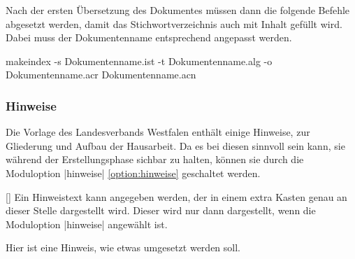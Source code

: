 \documentclass[
    a4paper,
    12pt,
    parskip=half,
]{scrartcl}
\begin{document}
\begin{sourcecode}
    \printglossary[type=\acronymtype,title=Abkürzungsverzeichnis,style=long]
\end{sourcecode}

Nach der ersten Übersetzung des Dokumentes müssen dann die folgende Befehle abgesetzt werden, damit das Stichwortverzeichnis auch mit Inhalt gefüllt wird. Dabei muss der Dokumentenname entsprechend angepasst werden.

\begin{sourcecode}
    makeindex -s Dokumentenname.ist -t Dokumentenname.alg -o Dokumentenname.acr Dokumentenname.acn
\end{sourcecode}

\subsubsection{Hinweise}\label{sec:HausarbeitHinweise}
Die Vorlage des Landesverbands Westfalen enthält einige Hinweise, zur Gliederung und Aufbau der Hausarbeit. Da es bei diesen sinnvoll sein kann, sie während der Erstellungsphase sichbar zu halten, können sie durch die Moduloption \verbcode|hinweise| \ref{option:hinweise} geschaltet werden.

\begin{commands}
    []
        Ein Hinweistext kann angegeben werden, der in einem extra Kasten genau an dieser Stelle dargestellt wird. Dieser wird nur dann dargestellt, wenn die Moduloption \verbcode|hinweise| angewählt ist.
\begin{sourcecode}
\end{sourcecode}
    \begin{tcolorbox}[
            colback=white,
            colframe=dlrgRot,
            fonttitle=\bfseries,
            title=Hinweis -- bei einer Nutzung als Vorlage bitte löschen oder deaktivieren
        ]
        Hier ist eine Hinweis, wie etwas umgesetzt werden soll.
    \end{tcolorbox}
\end{commands}
\end{document}
